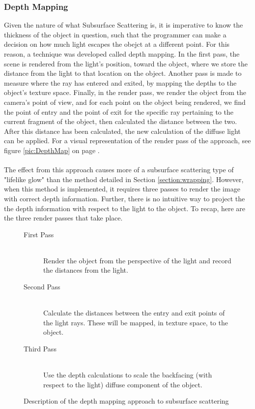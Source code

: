 \documentclass[a4paper, 12pt]{article}
\begin{document}
\subsubsection{Depth Mapping} 
\label{section:DepthMap}

Given the nature of what Subsurface Scattering is, it is imperative to know
the thickness of the object in question, such that the programmer can make a
decision on how much light escapes the obejct at a different point. For this
reason, a technique was developed called depth mapping. In the first pass, the
scene is rendered from the light's position, toward the object, where we store
the distance from the light to that location on the object. Another pass is
made to measure where the ray has entered and exited, by mapping the depths to
the object's texture space. Finally, in the render pass, we render the object
from the camera's point of view, and for each point on the object being
rendered, we find the point of entry and the point of exit for the specific
ray pertaining to the current fragment of the object, then calculated the
distance between the two. After this distance has been calculated, the new
calculation of the diffuse light can be applied. For a visual representation
of the render pass of the approach, see figure \ref{pic:DepthMap} on page
\pageref{pic:DepthMap}. \\ \\ The effect from this approach causes more of a
subsurface scattering type of "lifelike glow" than the method detailed in
Section \ref{section:wrapping}. However, when this method is implemented, it
requires three passes to render the image with correct depth information.
Further, there is no intuitive way to project the the depth information with
respect to the light to the object. To recap, here are the three render passes
that take place.



\begin{figure}[h]

\begin{description}

\item[First Pass] \hfill \\ Render the object from the perspective of the
light and record the distances from the light.

\item[Second Pass] \hfill \\ Calculate the distances between the entry and
exit points of the light rays. These will be mapped, in texture space, to the
object.

\item[Third Pass] \hfill \\ Use the depth calculations to scale the backfacing
(with respect to the light) diffuse component of the object.

\end{description}
\caption{Description of the depth mapping approach to subsurface scattering}
\label{figure:depthDesc}
\end{figure}
\end{document}
